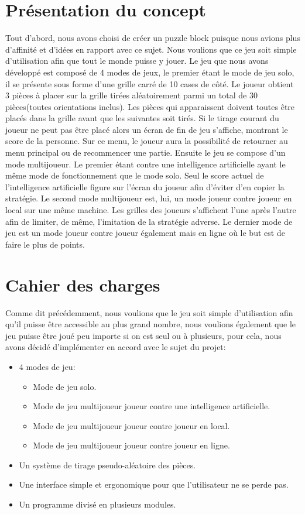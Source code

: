 \documentclass[a4paper]{report}
\begin{document}
\section{Présentation du concept}
Tout d'abord, nous avons choisi de créer un puzzle block puisque nous avions plus d'affinité et d'idées en rapport avec ce sujet. Nous voulions que ce jeu soit simple d'utilisation afin que tout le monde puisse y jouer. Le jeu que nous avons développé est composé de 4 modes de jeux, le premier étant le mode de jeu solo, il se présente sous forme d'une grille carré de 10 cases de côté. Le joueur obtient 3 pièces à placer sur la grille tirées aléatoirement parmi un total de 30 pièces(toutes orientations inclus). Les pièces qui apparaissent doivent toutes être placés dans la grille avant que les suivantes soit tirés. Si le tirage courant du joueur ne peut pas être placé alors un écran de fin de jeu s'affiche, montrant le score de la personne. Sur ce menu, le joueur aura la possibilité de retourner au menu principal ou de recommencer une partie. Ensuite le jeu se compose d'un mode multijoueur. Le premier étant contre une intelligence artificielle ayant le même mode de fonctionnement que le mode solo. Seul le score actuel de l'intelligence artificielle figure sur l'écran du joueur afin d'éviter d'en copier la stratégie. Le second mode multijoueur est, lui, un mode joueur contre joueur en local sur une même machine. Les grilles des joueurs s'affichent l'une après l'autre afin de limiter, de même, l'imitation de la stratégie adverse. Le dernier mode de jeu est un mode joueur contre joueur également mais en ligne où le but est de faire le plus de points.
\section{Cahier des charges}
Comme dit précédemment, nous voulions que le jeu soit simple d'utilisation afin qu'il puisse être accessible au plus grand nombre, nous voulions également que le jeu puisse être joué peu importe si on est seul ou à plusieurs, pour cela, nous avons décidé d'implémenter en accord avec le sujet du projet:
\begin{itemize}
	\item 4 modes de jeu: 
	\begin{itemize}
		\item Mode de jeu solo.
		\item Mode de jeu multijoueur joueur contre une intelligence artificielle.
		\item Mode de jeu multijoueur joueur contre joueur en local.
		\item Mode de jeu multijoueur joueur contre joueur en ligne.	
	\end{itemize}
	\item Un système de tirage pseudo-aléatoire des pièces.
	\item Une interface simple et ergonomique pour que l'utilisateur ne se perde pas.
	\item Un programme divisé en plusieurs modules.
\end{itemize}
\end{document}
